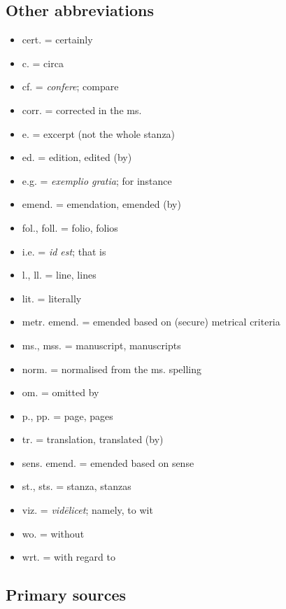 \subsection{Other abbreviations}
\begin{itemize}%
	\item cert. = certainly
	\item c. = circa
	\item cf. = \emph{confere}; compare
	\item corr. = corrected in the ms.
	\item e. = excerpt (not the whole stanza)
	\item ed. = edition, edited (by)
	\item e.g. = \emph{exemplio gratia}; for instance
	\item emend. = emendation, emended (by)
	\item fol., foll. = folio, folios
	\item i.e. = \emph{id est}; that is
	\item l., ll. = line, lines
	\item lit. = literally
	\item metr. emend. = emended based on (secure) metrical criteria
	\item ms., mss. = manuscript, manuscripts
	\item norm. = normalised from the ms. spelling
	\item om. = omitted by
	\item p., pp. = page, pages
	\item tr. = translation, translated (by)
	\item sens. emend. = emended based on sense
	\item st., sts. = stanza, stanzas
	\item viz. = \emph{vidēlicet}; namely, to wit
	\item wo. = without
	\item wrt. = with regard to
\end{itemize}

\subsection{Primary sources}

\newcommand{\Allvismal}{%
	\emph{Alv}%
}
\newcommand{\Atlakvida}{%
	\emph{Akv}%
}
\newcommand{\Atlamal}{%
	\emph{Am}%
}
\newcommand{\Baldrsdraumar}{%
	\emph{Bdr}%
}
\newcommand{\Beowulf}{%
	\emph{Beow}%
}
\newcommand{\Brot}{%
	\emph{Brot}%
}
\newcommand{\Deor}{%
	\emph{Deer}%
}
\newcommand{\Fafnismal}{%
	\emph{Fáfn}%
}
\newcommand{\FostrbroedhraSaga}{%
	\emph{FbrS}%
}


